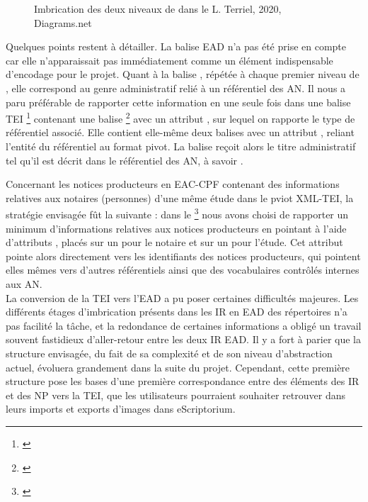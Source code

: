 \begin{figure}[h]
    \centering
    \centerline{}
    \caption{Imbrication des deux niveaux de  dans le  \textcopyright L. Terriel, 2020, Diagrams.net}
    \label{fig:metaliste}
\end{figure}

Quelques points restent à détailler. La balise EAD  n'a pas été prise en compte car elle n'apparaissait pas immédiatement comme un élément indispensable d'encodage pour le projet. Quant à la balise , répétée à chaque premier niveau de , elle correspond au genre administratif relié à un référentiel des AN. Il nous a paru préférable de rapporter cette information en une seule fois dans une balise TEI \footnote{\cite{tei_tei_nodate-19}} contenant une balise \footnote{\cite{tei_tei_nodate-18}} avec un attribut , sur lequel on rapporte le type de référentiel associé. Elle contient elle-même deux balises  avec un attribut , reliant l'entité du référentiel au format pivot. La balise reçoit alors le titre administratif tel qu'il est décrit dans le référentiel des AN, à savoir .

Concernant les notices producteurs en EAC-CPF contenant des informations relatives aux notaires (personnes) d'une même étude dans le pviot XML-TEI, la stratégie envisagée fût la suivante : dans le \footnote{\cite{tei_tei_nodate-17}} nous avons choisi de rapporter un minimum d'informations relatives aux notices producteurs en pointant à l'aide d'attributs , placés sur un  pour le notaire et sur un  pour l'étude. Cet attribut pointe alors directement vers les identifiants des notices producteurs, qui pointent elles mêmes vers d'autres référentiels ainsi que des vocabulaires contrôlés internes aux AN.\\

La conversion de la TEI vers l'EAD a pu poser certaines difficultés majeures. Les différents étages d'imbrication présents dans les IR en EAD des répertoires n'a pas facilité la tâche, et la redondance de certaines informations a obligé un travail souvent fastidieux d'aller-retour entre les deux IR EAD. Il y a fort à parier que la structure envisagée, du fait de sa complexité et de son niveau d'abstraction actuel, évoluera grandement dans la suite du projet. Cependant, cette première structure pose les bases d'une première correspondance entre des éléments des IR et des NP vers la TEI, que les utilisateurs pourraient souhaiter retrouver dans leurs imports et exports d'images dans eScriptorium.

